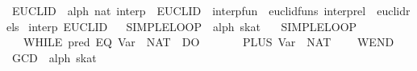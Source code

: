 \begin{isabellebody}
\endisatagproof
{\isafoldproof}%
%
\isadelimproof
\isanewline
%
\endisadelimproof
\isanewline
{}\isamarkupfalse%
\ EUCLID\ {}{}\ {}{}alph{}\ nat{}\ interp{}\ \ {}EUCLID\ {}\ {}interp{}fun\ {}\ euclid{}funs{}\ interp{}rel\ {}\ euclid{}rels{}{}\isanewline
\isanewline
{}\isamarkupfalse%
\ interp\ EUCLID%
\isadelimproof
\ %
\endisadelimproof
%
\isatagproof
{}\isamarkupfalse%
%
\endisatagproof
{\isafoldproof}%
%
\isadelimproof
%
\endisadelimproof
\isanewline
\isanewline
{}\isamarkupfalse%
\ SIMPLE{}LOOP\ {}{}\ {}alph\ skat{}\ \isanewline
\ \ {}SIMPLE{}LOOP\ {}\isanewline
\ \ \ WHILE\ {}{}pred\ {}EQ\ {}Var\ {}{}\ {}NAT\ {}{}{}{}\ DO\isanewline
\ \ \ \ \ {}\ {}{}\ PLUS\ {}Var\ {}{}\ {}NAT\ {}{}\isanewline
\ \ \ WEND{}\isanewline
\isanewline
{}\isamarkupfalse%
\ GCD\ {}{}\ {}alph\ skat{}\ \isanewline

\end{isabellebody}
